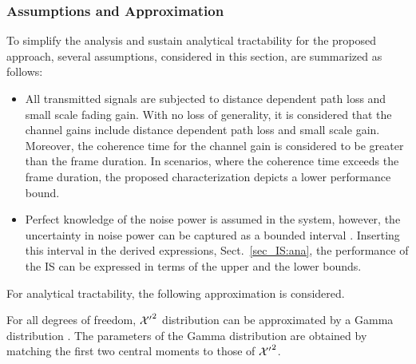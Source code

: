 \subsubsection{Assumptions and Approximation}
To simplify the analysis and sustain analytical tractability for the proposed approach, several assumptions, considered in this section, are summarized as follows:
\begin{itemize}
\item All transmitted signals are subjected to distance dependent path loss and small scale fading gain. %
With no loss of generality, it is considered that the channel gains include distance dependent path loss and small scale gain. Moreover, the coherence time for the channel gain is considered to be greater than the frame duration. In scenarios, where the coherence time exceeds the frame duration, the proposed characterization depicts a lower performance bound.
\item Perfect knowledge of the noise power is assumed in the system, however, the uncertainty in noise power can be captured as a bounded interval \cite{Tan08}. Inserting this interval in the derived expressions,  Sect.~\ref{sec_IS:ana}, the performance of the IS can be expressed in terms of the upper and the lower bounds.
\end{itemize}
For analytical tractability, the following approximation is considered.
\begin{approxi} \label{ap:ap1}
\normalfont
For all degrees of freedom, $\ncchi2$ distribution can be approximated by a Gamma distribution \cite{abramo}. The parameters of the Gamma distribution are obtained by matching the first two central moments to those of $\ncchi2$.
\end{approxi}


